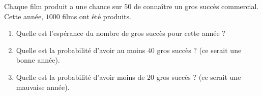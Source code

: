 
\begin{exercice}\label{exosmath-0290}

    Chaque film produit a une chance sur \( 50\) de connaître un gros succès commercial. Cette année, \( 1000\) films ont été produits.

    \begin{enumerate}
        \item
            Quelle est l'espérance du nombre de gros succès pour cette année ?
        \item
            Quelle est la probabilité d'avoir au moins \( 40\) gros succès ? (ce serait une bonne année).
        \item
            Quelle est la probabilité d'avoir moins de \( 20\) gros succès ? (ce serait une mauvaise année). 
    \end{enumerate}

\end{exercice}

